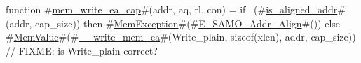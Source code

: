 function #\hyperref[sailRISCVzmemzywritezyeazycap]{mem\_write\_ea\_cap}#(addr, aq, rl, con) = {
  if   ~(#\hyperref[sailRISCVziszyalignedzyaddr]{is\_aligned\_addr}#(addr, cap_size))
  then #\hyperref[sailRISCVzMemException]{MemException}#(#\hyperref[sailRISCVzEzySAMOzyAddrzyAlign]{E\_SAMO\_Addr\_Align}#())
  else #\hyperref[sailRISCVzMemValue]{MemValue}#(#\hyperref[sailRISCVzzyzywritezymemzyea]{\_\_write\_mem\_ea}#(Write_plain, sizeof(xlen), addr, cap_size)) // FIXME: is Write_plain correct?
}
